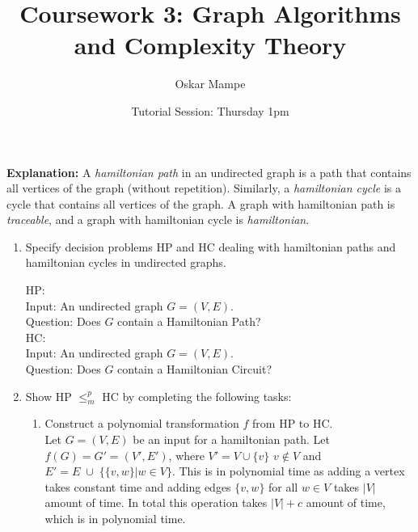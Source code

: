 \documentclass[11pt,a4paper]{article}
\title{Coursework 3: Graph Algorithms and Complexity Theory}
\author{Oskar Mampe}
\date{Tutorial Session: Thursday 1pm}
\newcommand{\hc} {HC}
\newcommand{\hp} {HP}
\begin{document}
\maketitle
\thispagestyle{empty}

\textbf{Explanation: } A \textit{hamiltonian path} in an undirected graph is a path that contains all vertices of the graph (without repetition).  Similarly, a \textit{hamiltonian cycle} is a cycle that contains all vertices of the graph.  A graph with hamiltonian path is \textit{traceable}, and a graph with hamiltonian cycle is \textit{hamiltonian}.

\begin{enumerate}
    \item Specify decision problems \hp{} and \hc{}  dealing with hamiltonian paths and hamiltonian cycles in undirected graphs.
    
    \hp{}:\\ Input: An undirected graph $G = (V, E)$.\\ Question: Does $G$ contain a Hamiltonian Path?\\


    \hc{}:\\ Input: An undirected graph $G = (V, E)$.\\ Question: Does $G$ contain a Hamiltonian Circuit?\\

    \item Show \hp{} $\leq^p_m$ \hc{} by completing the following tasks: 
        \begin{enumerate}
            \item Construct a polynomial transformation $f$ from \hp{} to \hc{}.\\
            Let $G = (V, E)$ be an input for a hamiltonian path. Let $f(G) = G'  = (V', E')$,
             where $V' = V \cup \{v\}$ $v \notin V$ and $E' = E \; \cup  \; \{ \{ v, w\} | w \in V\}$.
             This is in polynomial time as adding a vertex takes constant time and adding edges $\{v, w \}$
              for all $w \in V$ takes $|V|$ amount of time. In total this operation takes $|V| + c$ amount of time, which is in polynomial time. 
              \begin{center}
\end{center}
\end{enumerate}
\end{enumerate}
\end{document}
